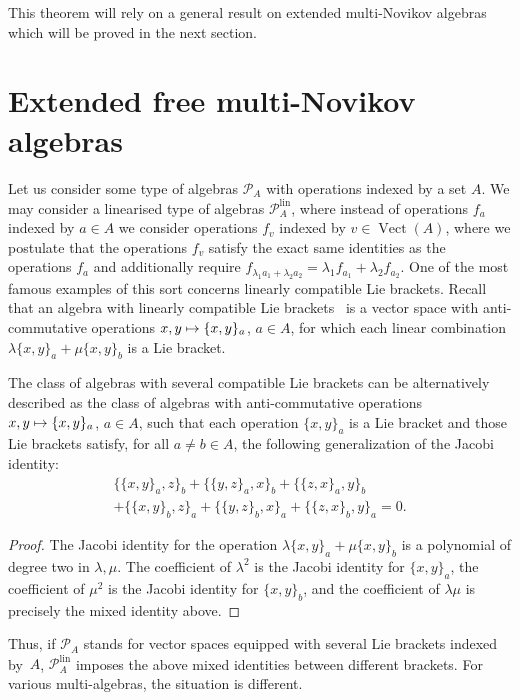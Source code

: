 \documentclass[AHL,Unicode,longabstracts]{cedram}
\newcommand{\cP}{\mathcal{P}}
\newcommand{\linn}{\mathrm{lin}}
\DeclareMathOperator{\Vect}{Vect}
\let\oldmapsto\mapsto
\renewcommand*{\mapsto}{\mathchoice{\longmapsto}{\oldmapsto}{\oldmapsto}{\oldmapsto}}
\begin{document}
This theorem will rely on a general result on extended multi-Novikov algebras which will be proved in the next section.

\section{Extended free multi-Novikov algebras}\label{sec::5}
Let us consider some type of algebras $\cP_A$ with operations indexed by a set $A$. We may consider a linearised type of algebras $\cP_A^{\linn}$, where instead of operations $f_a$ indexed by $a\in A$ we consider operations $f_v$ indexed by $v\in\Vect(A)$, where we postulate that the operations $f_v$ satisfy the exact same identities as the operations $f_a$ and additionally require $f_{\lambda_1a_1+\lambda_2a_2}=\lambda_1f_{a_1}+\lambda_2f_{a_2}$. One of the most famous examples of this sort concerns linearly compatible Lie brackets. Recall that an algebra with linearly compatible Lie brackets~\cite{DK} is a vector space with anti-commutative operations $x,y\mapsto \{x,y\}_a$, $a\in A$, for which each linear combination $\lambda\{x,y\}_{a}+\mu\{x,y\}_{b}$ is a Lie bracket.

\begin{prop}
The class of algebras with several compatible Lie brackets can be alternatively described as the class of algebras with anti-commutative operations $x,y\mapsto \{x,y\}_a$, $a\in A$, such that each operation $\{x,y\}_{a}$ is a Lie bracket and those Lie brackets satisfy, for all $a\ne b\in A$, the following generalization of the Jacobi identity:
\begin{multline*}
\{\{x,y\}_a,z\}_b+\{\{y,z\}_a,x\}_b+\{\{z,x\}_a,y\}_b\\ + \{\{x,y\}_b,z\}_a+\{\{y,z\}_b,x\}_a+\{\{z,x\}_b,y\}_a=0.
\end{multline*}
\end{prop}

\begin{proof}
The Jacobi identity for the operation $\lambda\{x,y\}_{a}+\mu\{x,y\}_{b}$ is a polynomial of degree two in $\lambda,\mu$. The coefficient of $\lambda^2$ is the Jacobi identity for $\{x,y\}_{a}$, the coefficient of $\mu^2$ is the Jacobi identity for $\{x,y\}_{b}$, and the coefficient of $\lambda\mu$ is precisely the mixed identity above.
\end{proof}

Thus, if $\cP_A$ stands for vector spaces equipped with several Lie brackets indexed by~$A$, $\cP_A^{\linn}$ imposes the above mixed identities between different brackets. For various multi-algebras, the situation is different.
\end{document}

